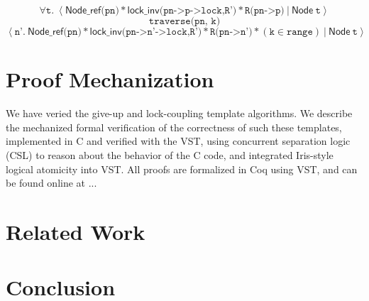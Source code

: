 \documentclass[a4paper,UKenglish,cleveref, autoref, thm-restate]{lipics-v2021}
\newcommand{\treerep}{\ensuremath{\mathsf{Node}}}
\newcommand{\nodeboxrep}{\ensuremath{\mathsf{Node\_ref}}}
\newcommand{\lockinv}{\ensuremath{\mathsf{lock\_inv}}}
\begin{document}
$$\forall \texttt{t}.\ \left\langle \nodeboxrep \texttt{(pn)} \ast \lockinv \texttt{(pn->p->lock,R'}) \ast \texttt{R(pn->p)} \ | \ \treerep\ \texttt{t} \right\rangle $$
$$\texttt{traverse(pn, k)}$$
$$\left\langle \texttt{n'}.\ \nodeboxrep \texttt{(pn)} \ast \lockinv \texttt{(pn->n'->lock,R')} \ast \texttt{R(pn->n')} \ast (\texttt{k} \in \texttt{range})
\ |\ \treerep\ \texttt{t} \right\rangle$$


\section{Proof Mechanization}
We have veried the give-up and lock-coupling template algorithms.
We describe the mechanized formal verification of the correctness of such these templates, implemented in C and verified with the VST, using concurrent separation
logic (CSL) to reason about the behavior of the C code, and integrated Iris-style logical atomicity into VST. All proofs are formalized in Coq using VST, and can be found online at ... 

\section{Related Work}

\section{Conclusion}







\end{document}
